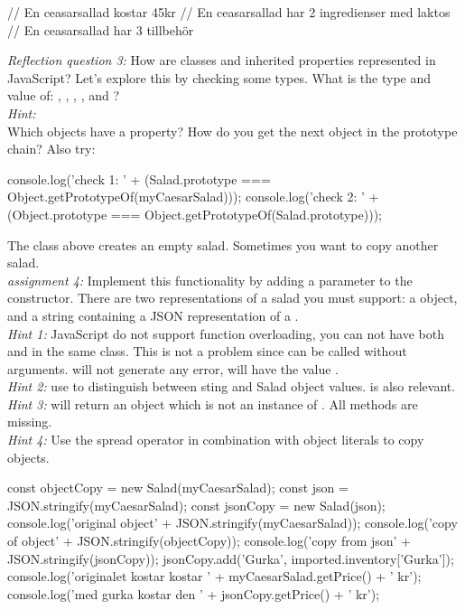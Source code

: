 \documentclass[fleqn, article, a4paper]{memoir}
\begin{document}
\begin{Assignments}
\begin{Code}
// En ceasarsallad kostar 45kr
// En ceasarsallad har 2 ingredienser med laktos
// En ceasarsallad har 3 tillbehör
\end{Code}
\emph{Reflection question 3:} How are classes and inherited properties represented in JavaScript? Let's explore this by checking some types. What is the type and value of: , , , , and ?
\\ \emph{Hint: } 
\\Which objects have a  property? How do you get the next object in the prototype chain? Also try:
\begin{Code}
console.log('check 1: ' + 
  (Salad.prototype === Object.getPrototypeOf(myCaesarSalad)));
console.log('check 2: ' + 
  (Object.prototype === Object.getPrototypeOf(Salad.prototype)));
 \end{Code}

\item The class above creates an empty salad. Sometimes you want to copy another salad. 
\\ \emph{assignment 4:} Implement this functionality by adding a parameter to the constructor. There are two representations of a salad you must support: a  object, and a string containing a JSON representation of a . 
\\\emph{Hint 1:} JavaScript do not support function overloading, you can not have both  and  in the same class. This is not a problem since  can be called without arguments.  will not generate any error,  will have the value .
\\\emph{Hint 2:} use  to distinguish between sting and Salad object values.  is also relevant.
\\\emph{Hint 3:}  will return an object which is not an instance of . All methods are missing.
\\\emph{Hint 4:} Use the spread operator in combination with object literals to copy objects.
\begin{Code}
const objectCopy = new Salad(myCaesarSalad);
const json = JSON.stringify(myCaesarSalad);
const jsonCopy = new Salad(json);
console.log('original object\n' + JSON.stringify(myCaesarSalad));
console.log('copy of object\n' + JSON.stringify(objectCopy));
console.log('copy from json\n' + JSON.stringify(jsonCopy));
jsonCopy.add('Gurka', imported.inventory['Gurka']);
console.log('originalet kostar kostar ' + myCaesarSalad.getPrice() + ' kr');
console.log('med gurka kostar den ' + jsonCopy.getPrice() + ' kr');
\end{Code}


\end{Assignments}
\end{document}
